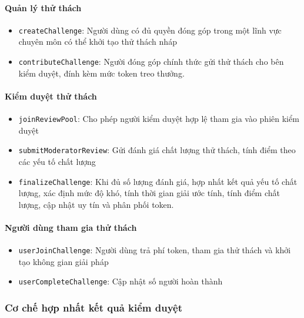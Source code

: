 \paragraph{Quản lý thử thách}

\begin{itemize}
  \item \texttt{createChallenge}: Người dùng có đủ quyền đóng góp trong một lĩnh vực chuyên môn có thể khởi tạo thử thách nháp
  \item \texttt{contributeChallenge}: Người đóng góp chính thức gửi thử thách cho bên kiểm duyệt, đính kèm mức token treo thưởng.
\end{itemize}

\paragraph{Kiểm duyệt thử thách}

\begin{itemize}
  \item \texttt{joinReviewPool}: Cho phép người kiểm duyệt hợp lệ tham gia vào phiên kiểm duyệt
  \item \texttt{submitModeratorReview}: Gửi đánh giá chất lượng thử thách, tính điểm theo các yếu tố chất lượng
  \item \texttt{finalizeChallenge}: Khi đủ số lượng đánh giá, hợp nhất kết quả yếu tố chất lượng, xác định mức độ khó, tính thời gian giải ước tính, tính điểm chất lượng, cập nhật uy tín và phân phối token.
\end{itemize}

\paragraph{Người dùng tham gia thử thách}

\begin{itemize}
  \item \texttt{userJoinChallenge}: Người dùng trả phí token, tham gia thử thách và khởi tạo không gian giải pháp
  \item \texttt{userCompleteChallenge}: Cập nhật số người hoàn thành
\end{itemize}

\subsubsection{Cơ chế hợp nhất kết quả kiểm duyệt}

